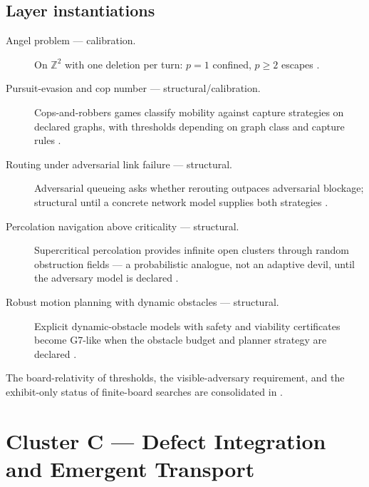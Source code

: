 \documentclass[11pt]{article}
\newcommand{\clusterC}{Defect Integration and Emergent Transport}
\theoremstyle{definition}
\begin{document}
\subsection*{Layer instantiations}\label{layer-inst:G7}
\begin{description}
  \item[Angel problem --- calibration.] On $\mathbb{Z}^2$ with one deletion per turn: $p = 1$
    confined, $p \ge 2$ escapes
    \citep{BerlekampConwayGuy1982,Conway1996,Bowditch2007,Mathe2007,Kloster2007,Gacs2007}.
  \item[Pursuit-evasion and cop number --- structural/calibration.] Cops-and-robbers games classify
    mobility against capture strategies on declared graphs, with thresholds depending on graph class
    and capture rules \citep{NowakowskiWinkler1983,AignerFromme1984}.
  \item[Routing under adversarial link failure --- structural.] Adversarial queueing asks whether
    rerouting outpaces adversarial blockage; structural until a concrete network model supplies both
    strategies \citep{BorodinEtAl2001}.
  \item[Percolation navigation above criticality --- structural.] Supercritical percolation provides
    infinite open clusters through random obstruction fields --- a probabilistic analogue, not an
    adaptive devil, until the adversary model is declared \citep{Grimmett1999,Kesten1982}.
  \item[Robust motion planning with dynamic obstacles --- structural.] Explicit dynamic-obstacle
    models with safety and viability certificates become G7-like when the obstacle budget and planner
    strategy are declared \citep{LaValle2006,FraichardAsama2004}.
\end{description}

The board-relativity of thresholds, the visible-adversary requirement, and the exhibit-only status of
finite-board searches are consolidated in .
 \section{Cluster C --- \clusterC}\label{sec:clusterC}
\end{document}
